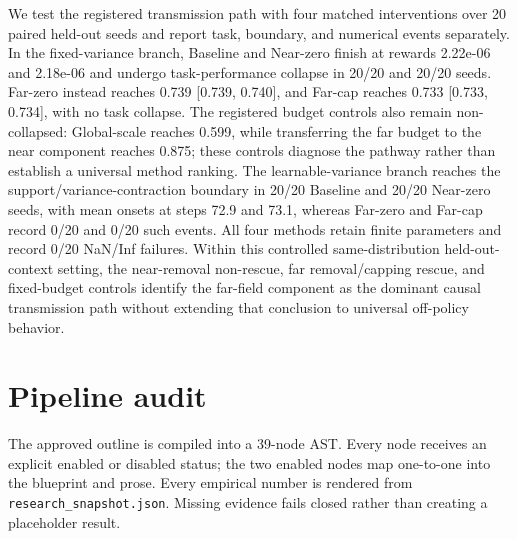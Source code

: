 \documentclass[9pt]{article}
\begin{document}
We test the registered transmission path with four matched interventions over 20 paired held-out seeds and report task, boundary, and numerical events separately. In the fixed-variance branch, Baseline and Near-zero finish at rewards 2.22e-06 and 2.18e-06 and undergo task-performance collapse in 20/20 and 20/20 seeds. Far-zero instead reaches 0.739 [0.739, 0.740], and Far-cap reaches 0.733 [0.733, 0.734], with no task collapse. The registered budget controls also remain non-collapsed: Global-scale reaches 0.599, while transferring the far budget to the near component reaches 0.875; these controls diagnose the pathway rather than establish a universal method ranking. The learnable-variance branch reaches the support/variance-contraction boundary in 20/20 Baseline and 20/20 Near-zero seeds, with mean onsets at steps 72.9 and 73.1, whereas Far-zero and Far-cap record 0/20 and 0/20 such events. All four methods retain finite parameters and record 0/20 NaN/Inf failures. Within this controlled same-distribution held-out-context setting, the near-removal non-rescue, far removal/capping rescue, and fixed-budget controls identify the far-field component as the dominant causal transmission path without extending that conclusion to universal off-policy behavior.

\section*{Pipeline audit}
The approved outline is compiled into a 39-node AST. Every node receives an
explicit enabled or disabled status; the two enabled nodes map one-to-one into
the blueprint and prose. Every empirical number is rendered from
\texttt{research\_snapshot.json}. Missing evidence fails closed rather than
creating a placeholder result.
\end{document}
